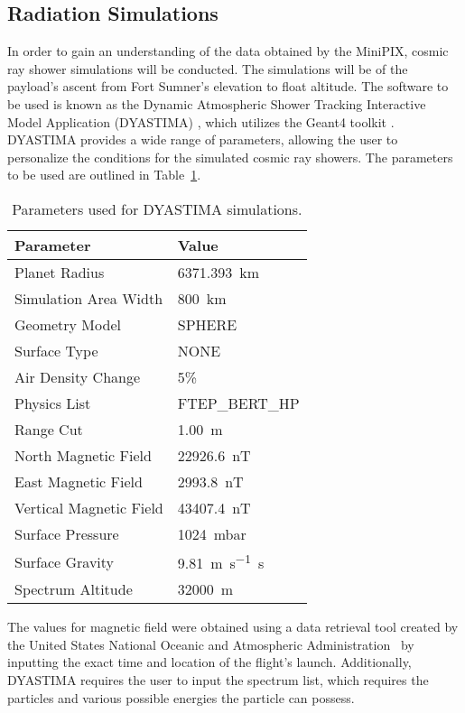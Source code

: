\subsection{Radiation Simulations}
\label{sec:MiniPIX Simulations}

In order to gain an understanding of the data obtained by the MiniPIX, cosmic ray shower simulations will be conducted. The simulations will be of the payload's ascent from Fort Sumner's elevation to float altitude. The software to be used is known as the Dynamic Atmospheric Shower Tracking Interactive Model Application (DYASTIMA) \cite{dyastima}, which utilizes the Geant4 toolkit \cite{geant4}. DYASTIMA provides a wide range of parameters, allowing the user to personalize the conditions for the simulated cosmic ray showers. The parameters to be used are outlined in Table~\ref{tab:dyastima}.

\begin{table}[!h]
  \begin{center}
    \caption{Parameters used for DYASTIMA simulations.} 
    \label{tab:dyastima}
    \bigskip
    \begin{tabular}{|l|l|}
      \hline
      \multicolumn{1}{|l|}{\bf Parameter} &
      \multicolumn{1}{l|}{\bf Value} \\
      \hline
      Planet Radius & \SI{6371.393}{\kilo\meter} \\ \hline
      Simulation Area Width & \SI{800}{\kilo\meter} \\ \hline
      Geometry Model & SPHERE \\ \hline
      Surface Type & NONE \\ \hline
      Air Density Change & 5\% \\ \hline
      Physics List & FTEP\_BERT\_HP \\ \hline
      Range Cut & \SI{1.00}{\meter} \\ \hline
      North Magnetic Field & \SI{22926.6}{\nano\tesla} \\ \hline
      East Magnetic Field & \SI{2993.8}{\nano\tesla} \\ \hline
      Vertical Magnetic Field & \SI{43407.4}{\nano\tesla} \\ \hline
      Surface Pressure & \SI{1024}{\milli\bar} \\ \hline
      Surface Gravity & \SI{9.81}{\meter\per\second\second} \\ \hline
      Spectrum Altitude & \SI{32000}{\meter} \\ \hline
    \end{tabular}
  \end{center}
\end{table}

The values for magnetic field were obtained using a data retrieval tool created by the United States National Oceanic and Atmospheric Administration~\cite{magnetictool} by inputting the exact time and location of the flight's launch. Additionally, DYASTIMA requires the user to input the spectrum list, which requires the particles and various possible energies the particle can possess. 

